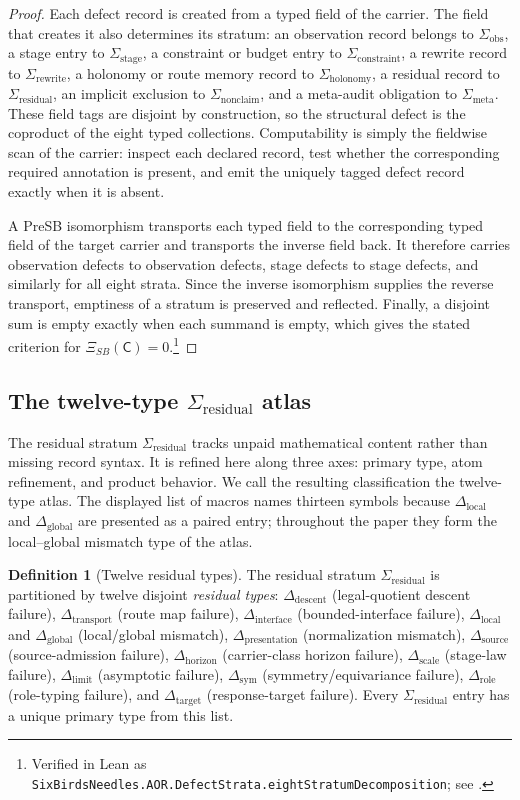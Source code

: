 \documentclass[11pt]{article}
\newcommand{\XiSB}{\Xi_{SB}}
\newcommand{\Sigobs}{\Sigma_{\mathrm{obs}}}
\newcommand{\Sigstage}{\Sigma_{\mathrm{stage}}}
\newcommand{\Sigconstr}{\Sigma_{\mathrm{constraint}}}
\newcommand{\Sigrewrite}{\Sigma_{\mathrm{rewrite}}}
\newcommand{\Sighol}{\Sigma_{\mathrm{holonomy}}}
\newcommand{\Sigres}{\Sigma_{\mathrm{residual}}}
\newcommand{\Signon}{\Sigma_{\mathrm{nonclaim}}}
\newcommand{\Sigmeta}{\Sigma_{\mathrm{meta}}}
\newcommand{\Ddescent}{\Delta_{\mathrm{descent}}}
\newcommand{\Dtransport}{\Delta_{\mathrm{transport}}}
\newcommand{\Dinterface}{\Delta_{\mathrm{interface}}}
\newcommand{\Dlocal}{\Delta_{\mathrm{local}}}
\newcommand{\Dglobal}{\Delta_{\mathrm{global}}}
\newcommand{\Dpresentation}{\Delta_{\mathrm{presentation}}}
\newcommand{\Dsource}{\Delta_{\mathrm{source}}}
\newcommand{\Dhorizon}{\Delta_{\mathrm{horizon}}}
\newcommand{\Dscale}{\Delta_{\mathrm{scale}}}
\newcommand{\Dlimit}{\Delta_{\mathrm{limit}}}
\newcommand{\Dsym}{\Delta_{\mathrm{sym}}}
\newcommand{\Drole}{\Delta_{\mathrm{role}}}
\newcommand{\Dtarget}{\Delta_{\mathrm{target}}}
\theoremstyle{definition}
\newtheorem{definition}[theorem]{Definition}
\begin{document}
\begin{proof}
Each defect record is created from a typed field of the carrier.  The field
that creates it also determines its stratum: an observation record belongs
to \(\Sigobs\), a stage entry to \(\Sigstage\), a constraint or budget entry
to \(\Sigconstr\), a rewrite record to \(\Sigrewrite\), a holonomy or route
memory record to \(\Sighol\), a residual record to \(\Sigres\), an implicit
exclusion to \(\Signon\), and a meta-audit obligation to \(\Sigmeta\).  These
field tags are disjoint by construction, so the structural defect is the
coproduct of the eight typed collections.  Computability is simply the
fieldwise scan of the carrier: inspect each declared record, test whether
the corresponding required annotation is present, and emit the uniquely
tagged defect record exactly when it is absent.

A PreSB isomorphism transports each typed field to the corresponding typed
field of the target carrier and transports the inverse field back.  It
therefore carries observation defects to observation defects, stage defects
to stage defects, and similarly for all eight strata.  Since the inverse
isomorphism supplies the reverse transport, emptiness of a stratum is
preserved and reflected.  Finally, a disjoint sum is empty exactly when each
summand is empty, which gives the stated criterion for \(\XiSB(\mathsf C)=0\).\footnote{Verified in Lean as \texttt{SixBirdsNeedles.AOR.DefectStrata.eightStratumDecomposition}; see .}
\end{proof}

\subsection{\texorpdfstring{The twelve-type \(\Sigma_{\mathrm{residual}}\) atlas}{The twelve-type Sigma-residual atlas}}\label{sec:aor-primary-results-atlas}

The residual stratum \(\Sigres\) tracks unpaid mathematical content
rather than missing record syntax.  It is refined here along three
axes: primary type, atom refinement, and product behavior.  We call
the resulting classification the twelve-type atlas.  The displayed
list of macros names thirteen symbols because \(\Dlocal\) and
\(\Dglobal\) are presented as a paired entry; throughout the paper
they form the local--global mismatch type of the atlas.

\begin{definition}[Twelve residual types]\label{def:aor:residual-types-twelve}
The residual stratum $\Sigres$ is partitioned by twelve disjoint
\emph{residual types}: $\Ddescent$ (legal-quotient descent failure),
$\Dtransport$ (route map failure), $\Dinterface$ (bounded-interface
failure), $\Dlocal$ and $\Dglobal$ (local/global mismatch),
$\Dpresentation$ (normalization mismatch), $\Dsource$ (source-admission
failure), $\Dhorizon$ (carrier-class horizon failure), $\Dscale$
(stage-law failure), $\Dlimit$ (asymptotic failure), $\Dsym$
(symmetry/equivariance failure), $\Drole$ (role-typing failure), and
$\Dtarget$ (response-target failure).  Every $\Sigres$ entry has a
unique primary type from this list.
\end{definition}
\end{document}
